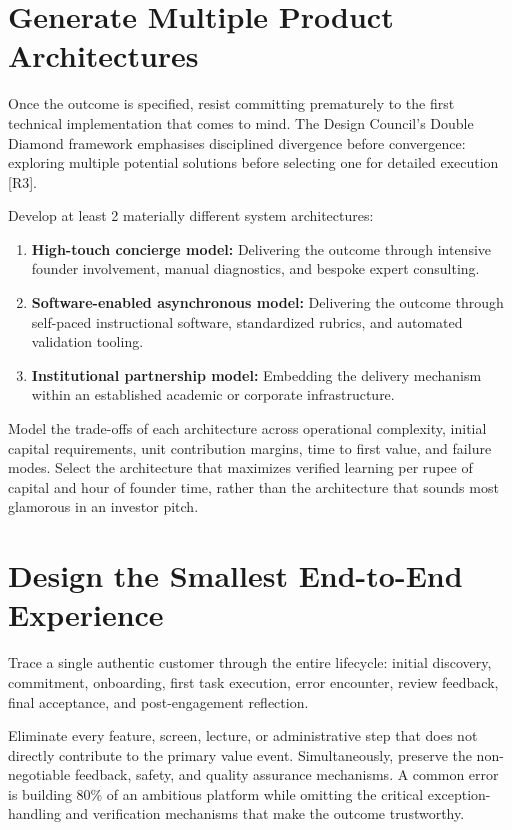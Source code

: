\section{Generate Multiple Product Architectures}

Once the outcome is specified, resist committing prematurely to the first technical implementation that comes to mind. The Design Council's Double Diamond framework emphasises disciplined divergence before convergence: exploring multiple potential solutions before selecting one for detailed execution [R3].

Develop at least 2 materially different system architectures:
\begin{enumerate}[leftmargin=*]
\item \textbf{High-touch concierge model:} Delivering the outcome through intensive founder involvement, manual diagnostics, and bespoke expert consulting.
\item \textbf{Software-enabled asynchronous model:} Delivering the outcome through self-paced instructional software, standardized rubrics, and automated validation tooling.
\item \textbf{Institutional partnership model:} Embedding the delivery mechanism within an established academic or corporate infrastructure.
\end{enumerate}

Model the trade-offs of each architecture across operational complexity, initial capital requirements, unit contribution margins, time to first value, and failure modes. Select the architecture that maximizes verified learning per rupee of capital and hour of founder time, rather than the architecture that sounds most glamorous in an investor pitch.

\section{Design the Smallest End-to-End Experience}

Trace a single authentic customer through the entire lifecycle: initial discovery, commitment, onboarding, first task execution, error encounter, review feedback, final acceptance, and post-engagement reflection.

Eliminate every feature, screen, lecture, or administrative step that does not directly contribute to the primary value event. Simultaneously, preserve the non-negotiable feedback, safety, and quality assurance mechanisms. A common error is building 80\% of an ambitious platform while omitting the critical exception-handling and verification mechanisms that make the outcome trustworthy.

